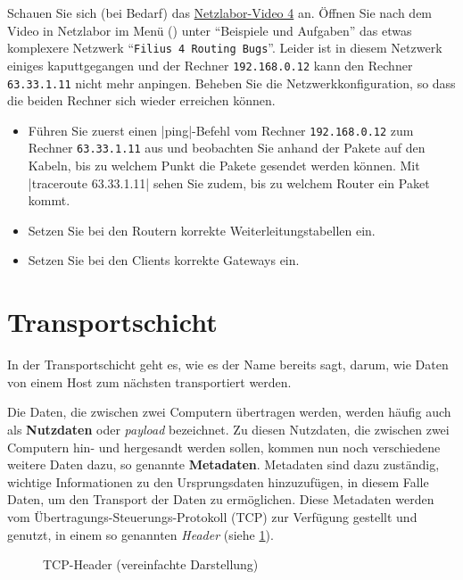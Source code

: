 \begin{myexercise}
	Schauen Sie sich (bei Bedarf) das \href{\netzlaborvideos}{Netzlabor-Video 4} an. Öffnen Sie nach dem Video in Netzlabor im Menü (\faBars) unter \enquote{Beispiele und Aufgaben} das etwas komplexere Netzwerk \enquote{\texttt{Filius 4 Routing Bugs}}. Leider ist in diesem Netzwerk einiges kaputtgegangen und der Rechner \texttt{192.168.0.12} kann den Rechner \texttt{63.33.1.11} nicht mehr anpingen. Beheben Sie die Netzwerkkonfiguration, so dass die beiden Rechner sich wieder erreichen können.
	\begin{itemize}
		\item Führen Sie zuerst einen \commandbox*|ping|-Befehl vom Rechner \texttt{192.168.0.12} zum Rechner \texttt{63.33.1.11} aus und beobachten Sie anhand der Pakete auf den Kabeln, bis zu welchem Punkt die Pakete gesendet werden können. Mit \commandbox*|traceroute 63.33.1.11| sehen Sie zudem, bis zu welchem Router ein Paket kommt.
		\item Setzen Sie bei den Routern korrekte Weiterleitungstabellen ein.
		\item Setzen Sie bei den Clients korrekte Gateways ein.
	\end{itemize}
\end{myexercise}

\section{\texorpdfstring{\textcolor{\transportLayerColor}{Transportschicht}}{Transportschicht}}
In der Transportschicht geht es, wie es der Name bereits sagt, darum, wie Daten von einem Host zum nächsten transportiert werden.

Die Daten, die zwischen zwei Computern übertragen werden, werden häufig auch als \textbf{Nutzdaten} oder \textit{payload} bezeichnet. Zu diesen Nutzdaten, die zwischen zwei Computern hin- und hergesandt werden sollen, kommen nun noch verschiedene weitere Daten dazu, so genannte \textbf{Metadaten}. Metadaten sind dazu zuständig, wichtige Informationen zu den Ursprungsdaten hinzuzufügen, in diesem Falle Daten, um den Transport der Daten zu ermöglichen. Diese Metadaten werden vom Übertragungs-Steuerungs-Protokoll (\gls{TCP}) zur Verfügung gestellt und genutzt, in einem so genannten \textit{Header} (siehe \cref{fig:tcp-header}).

\begin{figure}[H]
	\centering
	
	\caption{\gls{TCP}-Header (vereinfachte Darstellung)}
	\label{fig:tcp-header}
\end{figure}


